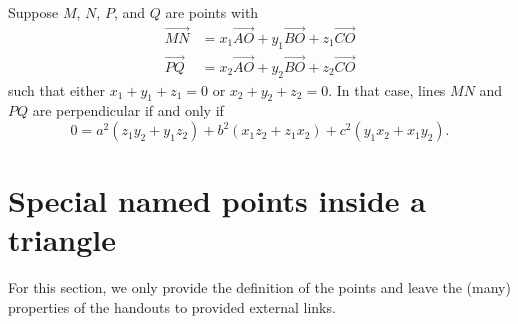 \documentclass[11pt]{scrartcl}
\begin{document}
\begin{theorem}
  Suppose $M$, $N$, $P$, and $Q$ are points with
  \begin{align*}
    \overrightarrow{MN} &= x_1 \overrightarrow{AO} + y_1 \overrightarrow{BO} + z_1 \overrightarrow{CO} \\
    \overrightarrow{PQ} &= x_2 \overrightarrow{AO} + y_2 \overrightarrow{BO} + z_2 \overrightarrow{CO}
  \end{align*}
  such that either $x_1+y_1+z_1=0$ or $x_2+y_2+z_2=0$.
  In that case, lines $MN$ and $PQ$ are perpendicular if and only if
  \[ 0 = a^2(z_1y_2 + y_1z_2) + b^2(x_1z_2 + z_1x_2) + c^2(y_1x_2 + x_1y_2). \]
\end{theorem}


\section{Special named points inside a triangle}
For this section, we only provide the definition of the points
and leave the (many) properties of the handouts to provided external links.
\end{document}
